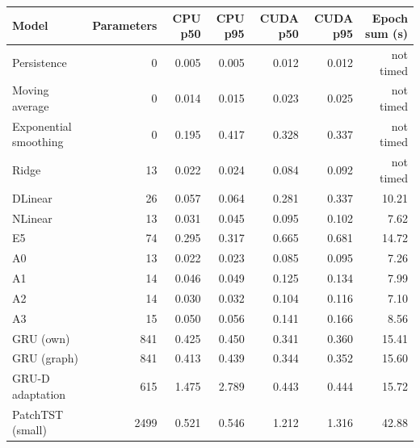 \begin{tabular}{lrrrrrr}
\toprule
Model & Parameters & CPU p50 & CPU p95 & CUDA p50 & CUDA p95 & Epoch sum (s) \\
\midrule
Persistence & 0 & 0.005 & 0.005 & 0.012 & 0.012 & not timed \\
Moving average & 0 & 0.014 & 0.015 & 0.023 & 0.025 & not timed \\
Exponential smoothing & 0 & 0.195 & 0.417 & 0.328 & 0.337 & not timed \\
Ridge & 13 & 0.022 & 0.024 & 0.084 & 0.092 & not timed \\
DLinear & 26 & 0.057 & 0.064 & 0.281 & 0.337 & 10.21 \\
NLinear & 13 & 0.031 & 0.045 & 0.095 & 0.102 & 7.62 \\
E5 & 74 & 0.295 & 0.317 & 0.665 & 0.681 & 14.72 \\
A0 & 13 & 0.022 & 0.023 & 0.085 & 0.095 & 7.26 \\
A1 & 14 & 0.046 & 0.049 & 0.125 & 0.134 & 7.99 \\
A2 & 14 & 0.030 & 0.032 & 0.104 & 0.116 & 7.10 \\
A3 & 15 & 0.050 & 0.056 & 0.141 & 0.166 & 8.56 \\
GRU (own) & 841 & 0.425 & 0.450 & 0.341 & 0.360 & 15.41 \\
GRU (graph) & 841 & 0.413 & 0.439 & 0.344 & 0.352 & 15.60 \\
GRU-D adaptation & 615 & 1.475 & 2.789 & 0.443 & 0.444 & 15.72 \\
PatchTST (small) & 2499 & 0.521 & 0.546 & 1.212 & 1.316 & 42.88 \\
\bottomrule
\end{tabular}
